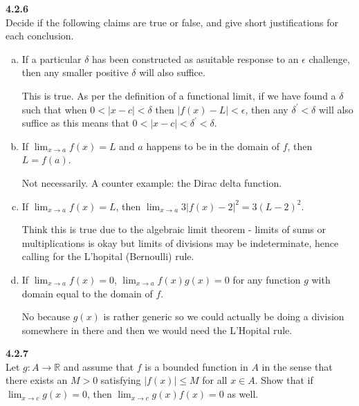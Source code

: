 \textbf{4.2.6}
\\

Decide if the following claims are true or false, and give short justifications for each conclusion.

\begin{enumerate}[(a)]
\item If a particular $\delta$ has been constructed as asuitable response to an $\epsilon$ challenge, then any smaller positive
$\delta$ will also suffice.

This is true. As per the definition of a functional limit, if we have found a $\delta$ such that when $0 < |x-c| < \delta$
then $|f(x) - L|<\epsilon$, then any $\delta^\prime < \delta$ will also suffice as this means that
$0 < |x-c| < \delta^\prime < \delta$.


\item If $\lim_{x\rightarrow a} f(x) = L$ and $a$ happens to be in the domain of $f$, then $L = f(a)$.

Not necessarily.
A counter example: the Dirac delta function.

\item If $\lim_{x\rightarrow a} f(x) = L$, then $\lim_{x\rightarrow a} 3|f(x) - 2|^2 = 3(L-2)^2$.

Think this is true due to the algebraic limit theorem - limits of sums or multiplications is okay but limits of divisions
may be indeterminate, hence calling for the L'hopital (Bernoulli) rule.

\item If $\lim_{x\rightarrow a} f(x) = 0$, $\lim_{x\rightarrow a} f(x)g(x) = 0$ for any function $g$ with domain equal to the
domain of $f$.

No because $g(x)$ is rather generic so we could actually be doing a division somewhere in there and then we would need the
L'Hopital rule.

\end{enumerate}



\textbf{4.2.7}
\\

Let $g : A \rightarrow \mathbb{R}$ and assume that $f$ is a bounded function in $A$
in the sense that there exists an $M > 0$ satisfying $|f(x)| \leq M$ for all $x \in A$.
Show that if $\lim_{x\rightarrow c} g(x) = 0$,
then $\lim_{x\rightarrow c} g(x)f(x) = 0$ as well.
\\